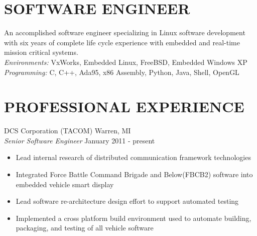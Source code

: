 \documentclass[line]{res}
\begin{document}
\address{Relocating to San Francisco, CA in 2012}
\address{mathew.prokos@gmail.com}

\begin{resume}
\section{SOFTWARE ENGINEER}
    \vspace{1mm}
    An accomplished software engineer specializing in Linux software
    development with six years of complete life cycle experience with
    embedded and real-time mission critical systems.\\

    \vspace{-5mm}
    {\sl Environments:} VxWorks, Embedded Linux, FreeBSD, Embedded Windows XP\\
    {\sl Programming:} C, C++, Ada95, x86 Assembly, Python, Java, Shell, OpenGL\\

\section{PROFESSIONAL EXPERIENCE}
    \vspace{1mm}
    DCS Corporation (TACOM)  \hfill Warren, MI\\
    {\sl Senior Software Engineer} \hfill January 2011 - present
    \vspace{1mm}
    \begin{itemize} 
       \item Lead internal research of distributed communication framework
       technologies  
       \item Integrated Force Battle Command Brigade and Below(FBCB2) software into
       embedded vehicle smart display
       \item Lead software re-architecture design effort to support automated testing 
       \item Implemented a cross platform build environment used to automate
       building, packaging, and testing of all vehicle software 
    \end{itemize}


\end{resume}
\end{document}

